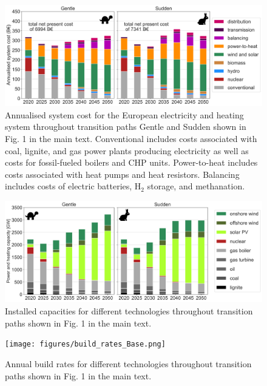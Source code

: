 \documentclass[3p]{elsarticle} %
\begin{document}
\begin{figure}[!h]
	\centering
	\includegraphics[width=\columnwidth]{figures/System_cost_Base.png}
	\caption{Annualised system cost for the European electricity and heating system throughout transition paths Gentle and Sudden shown in Fig. 1 in the main text. Conventional includes costs associated with coal, lignite, and gas power plants producing electricity as well as costs for fossil-fueled boilers and CHP units. Power-to-heat includes costs associated with heat pumps and heat resistors. Balancing includes costs of electric batteries, H$_2$ storage, and methanation. } \label{fig_system_cost} 
\end{figure}


\begin{figure}[!h]
	\centering
	\includegraphics[width=\columnwidth]{figures/installed_capacity_Base.png}
	\caption{Installed capacities for different technologies throughout transition paths shown in Fig. 1 in the main text.} \label{fig_installed_capacity} 
\end{figure}

\begin{figure}[!h]
\centering
\texttt{[image: figures/build\_rates\_Base.png]}
\caption{Annual build rates for different technologies throughout transition paths shown in Fig. 1 in the main text. } \label{fig_build_rates} 
\end{figure}
\end{document}
